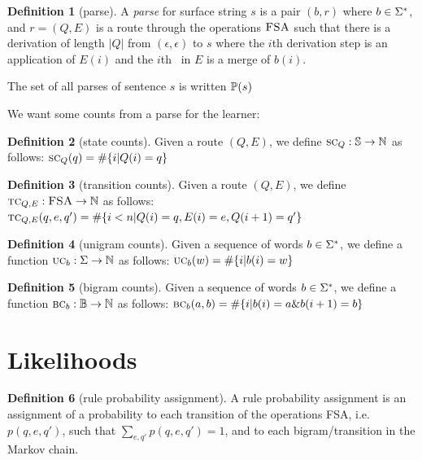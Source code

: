 \documentclass[12pt]{article}
\theoremstyle{definition}
\newtheorem{definition}{Definition}[section]
\begin{document}
\begin{definition}[parse]

A \textit{parse} for surface string $s$ is a pair $(b,r)$ where $b\in\Sigma^*$, and $r=(Q,E)$ is a route through the operations $\textsc{FSA}$ such that there is a derivation of length $|Q|$ from
 $(\epsilon,\epsilon)$ to  $s$ where the $i$th derivation step is an application of $E(i)$ and the $i$th \mg~in $E$ is a merge of $b(i)$.

The set of all parses of sentence $s$ is written $\mathbb{P}(s)$
\end{definition}

\noindent We want some counts from a parse for the learner:

\begin{definition}[state counts]
  Given a route $(Q,E)$, we define $\text{\textsc{sc}}_Q : \mathbb{S} \rightarrow\mathbb{N}$ as follows: $\text{\textsc{sc}}_Q(q) = \#\{ i | Q(i)=q \}$
\end{definition}


\begin{definition}[transition counts]
  Given a route $(Q,E)$, we define $\text{\textsc{tc}}_{Q,E} : \textsc{FSA} \rightarrow\mathbb{N}$ as follows: $\text{\textsc{tc}}_{Q,E}(q,e,q') = \#\{ i<n | Q(i)=q,E(i)=e,Q({i+1})=q'\}$
\end{definition}

\begin{definition}[unigram counts]
  Given a sequence of words $b\in\Sigma^*$, we define a function $\text{\textsc{uc}}_b : \Sigma \rightarrow\mathbb{N}$ as follows: $\text{\textsc{uc}}_b(w) = \#\{ i | b(i) = w \}$
\end{definition}


\begin{definition}[bigram counts]
  Given a sequence of words $b\in\Sigma^*$, we define a function $\text{\textsc{bc}}_{b} : \mathbb{B} \rightarrow\mathbb{N}$ as follows: $\text{\textsc{bc}}_b(a,b) = \#\{ i | b(i)=a \& b(i+1) = b \}$
\end{definition}


\section{Likelihoods}

\begin{definition}[rule probability assignment]
A rule probability assignment is an assignment of a probability to each transition of the operations FSA, i.e. $p(q,e,q')$, such that $\sum_{e,q'}p(q,e,q')=1$, and to each bigram/transition in the Markov chain.
\end{definition}
\end{document}
